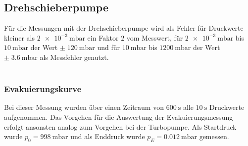 \subsection{Drehschieberpumpe}
Für die Messungen mit der Drehschieberpumpe wird als Fehler für Druckwerte kleiner als $\SI{2e-3}{\milli\bar}$ ein Faktor $2$ vom Messwert, für $\SI{2e-3}{\milli\bar}$ bis $\SI{10}{\milli\bar}$ der Wert $\pm\; \SI{120}{\milli\bar}$ 
und für $\SI{10}{\milli\bar}$ bis $\SI{1200}{\milli\bar}$ der Wert $\pm \;\SI{3.6}{\milli\bar}$ als Messfehler genutzt\cite{V70}. \\\\
\subsubsection{Evakuierungskurve}
Bei dieser Messung wurden über einen Zeitraum von $\SI{600}{\second}$ alle $\SI{10}{\second}$ Druckwerte aufgenommen.
Das Vorgehen für die Auswertung der Evakuierungsmessung erfolgt ansonsten analog zum Vorgehen bei der Turbopumpe.  
Als Startdruck wurde $p_0 = \SI{998}{\milli\bar}$ und als Enddruck wurde $p_E = \SI{0.012}{\milli\bar}$ gemessen.
